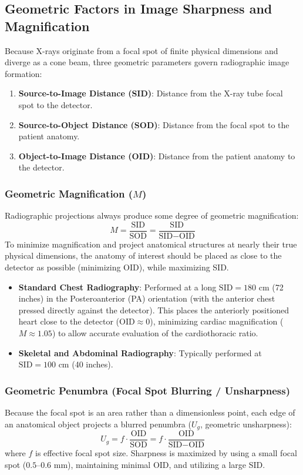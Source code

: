 \documentclass[11pt,a4paper]{article}
\begin{document}
\subsection{Geometric Factors in Image Sharpness and Magnification}
Because X-rays originate from a focal spot of finite physical dimensions and diverge as a cone beam, three geometric parameters govern radiographic image formation:
\begin{enumerate}
    \item \textbf{Source-to-Image Distance (SID)}: Distance from the X-ray tube focal spot to the detector.
    \item \textbf{Source-to-Object Distance (SOD)}: Distance from the focal spot to the patient anatomy.
    \item \textbf{Object-to-Image Distance (OID)}: Distance from the patient anatomy to the detector.
\end{enumerate}

\subsubsection{Geometric Magnification ($M$)}
Radiographic projections always produce some degree of geometric magnification:
\begin{equation}
    M = \frac{\text{SID}}{\text{SOD}} = \frac{\text{SID}}{\text{SID} - \text{OID}}
\end{equation}
To minimize magnification and project anatomical structures at nearly their true physical dimensions, the anatomy of interest should be placed as close to the detector as possible (minimizing OID), while maximizing SID.
\begin{itemize}
    \item \textbf{Standard Chest Radiography}: Performed at a long $\text{SID} = 180\text{ cm}$ (72 inches) in the Posteroanterior (PA) orientation (with the anterior chest pressed directly against the detector). This places the anteriorly positioned heart close to the detector ($\text{OID} \approx 0$), minimizing cardiac magnification ($M \approx 1.05$) to allow accurate evaluation of the cardiothoracic ratio.
    \item \textbf{Skeletal and Abdominal Radiography}: Typically performed at $\text{SID} = 100\text{ cm}$ (40 inches).
\end{itemize}

\subsubsection{Geometric Penumbra (Focal Spot Blurring / Unsharpness)}
Because the focal spot is an area rather than a dimensionless point, each edge of an anatomical object projects a blurred penumbra ($U_g$, geometric unsharpness):
\begin{equation}
    U_g = f \cdot \frac{\text{OID}}{\text{SOD}} = f \cdot \frac{\text{OID}}{\text{SID} - \text{OID}}
\end{equation}
where $f$ is effective focal spot size. Sharpness is maximized by using a small focal spot ($0.5\text{--}0.6\text{ mm}$), maintaining minimal OID, and utilizing a large SID.
\end{document}

